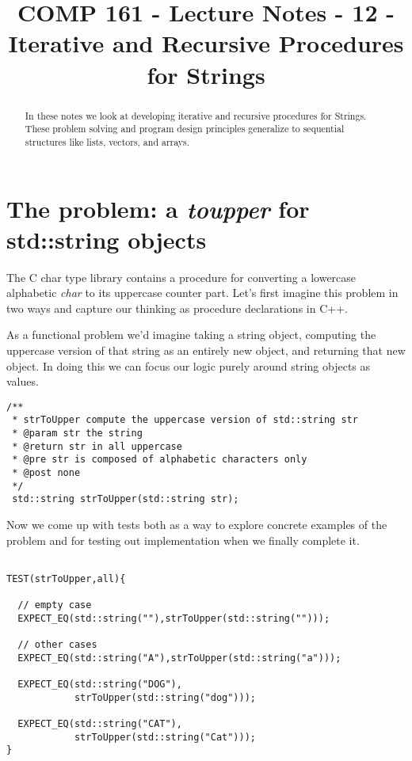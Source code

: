 \documentclass[]{tufte-handout}
\title{COMP 161 - Lecture Notes - 12 - Iterative and Recursive Procedures for Strings}
\date{}
\begin{document}
 
\maketitle

\begin{abstract}
In these notes we look at developing iterative and recursive procedures for Strings.  These problem solving and program design principles generalize to sequential structures like lists, vectors, and arrays.
\end{abstract}

\section{The problem: a \textit{toupper} for std::string objects}

The C char type library contains a procedure for converting a lowercase alphabetic \textit{char} to its uppercase counter part.  Let's first imagine this problem in two ways and capture our thinking as procedure declarations in C++. 

As a functional problem we'd imagine taking a string object, computing the uppercase version of that string as an entirely new object, and returning that new object.  In doing this we can focus our logic purely around string objects as values. 
  
\begin{verbatim}
/** 
 * strToUpper compute the uppercase version of std::string str
 * @param str the string
 * @return str in all uppercase
 * @pre str is composed of alphabetic characters only
 * @post none
 */
 std::string strToUpper(std::string str);
\end{verbatim}

Now we come up with tests both as a way to explore concrete examples of the problem and for testing out implementation when we finally complete it. 
\begin{verbatim}

TEST(strToUpper,all){

  // empty case
  EXPECT_EQ(std::string(""),strToUpper(std::string("")));

  // other cases
  EXPECT_EQ(std::string("A"),strToUpper(std::string("a")));

  EXPECT_EQ(std::string("DOG"),
            strToUpper(std::string("dog")));
          
  EXPECT_EQ(std::string("CAT"),
            strToUpper(std::string("Cat")));
}
\end{verbatim}
\end{document}
